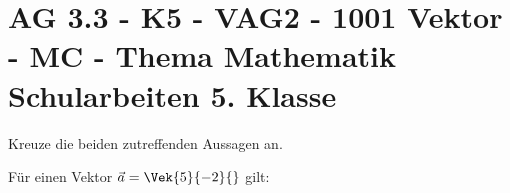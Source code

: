 \section{AG 3.3 - K5 - VAG2 - 1001 Vektor - MC - Thema Mathematik Schularbeiten 5. Klasse}

\begin{beispiel}[K5 - VAG2]{1} %
Kreuze die beiden zutreffenden Aussagen an.\leer

Für einen Vektor $\vec{a}=\Vek{5}{-2}{}$ gilt:

\end{beispiel}
